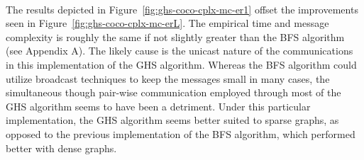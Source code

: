 \documentclass[11pt,epsf]{article}
\begin{document}
{{    \paragraph{}{
      The results depicted in Figure~\ref{fig:ghs-coco-cplx-mc-er1} offset the improvements seen in Figure~\ref{fig:ghs-coco-cplx-mc-erL}.
      The empirical time and message complexity is roughly the same if not slightly greater than the BFS algorithm (see Appendix A).
      The likely cause is the unicast nature of the communications in this implementation of the GHS algorithm. Whereas the BFS
      algorithm could utilize broadcast techniques to keep the messages small in many cases, the simultaneous though pair-wise
      communication employed through most of the GHS algorithm seems to have been a detriment. Under this particular implementation,
      the GHS algorithm seems better suited to sparse graphs, as opposed to the previous implementation of the BFS algorithm, which
      performed better with dense graphs\autocite[11,19]{bfs-coco}.
    }
}}
\end{document}
